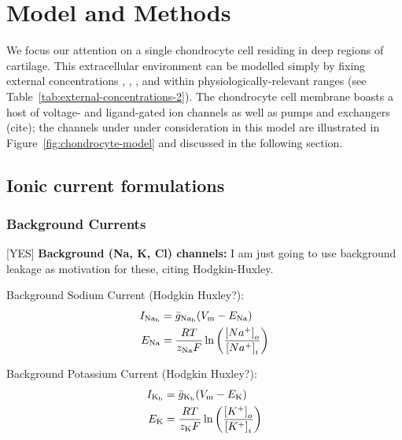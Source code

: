 \section*{Model and Methods}
\label{sec:model-and-methods}

We focus our attention on a single chondrocyte cell residing in deep
regions of cartilage. This extracellular environment can be modelled
simply by fixing external concentrations \Nao, \Ko, \Cao, \Ho and \Clo
within physiologically-relevant ranges (see
Table~\ref{tab:external-concentrations-2}). The chondrocyte cell
membrane boasts a host of voltage- and ligand-gated ion channels as
well as pumps and exchangers (cite); the channels under under
consideration in this model are illustrated in
Figure~\ref{fig:chondrocyte-model} and discussed in the following
section.

\subsection*{Ionic current formulations}
\label{sec:formulation-ionic-current}


\subsubsection*{Background Currents}
\label{sec:background-currents}

[YES] {\bf Background (Na, K, Cl) channels:} I am just going to use
background leakage as motivation for these, citing Hodgkin-Huxley.

Background Sodium Current (Hodgkin Huxley?):
\begin{equation}
  \begin{split}
    I_{\rm Na_b} & = \bar{g}_{\rm Na_b} (V_{\rm m} - E_{\rm Na})\\
    E_{\rm Na} & =  \frac{R T}{z_{\rm Na} F}
    \ln\left(\frac{\left[Na^{+}\right]_{o}}
      {\left[Na^{+}\right]_{i}}\right)
  \end{split}
\end{equation}

Background Potassium Current (Hodgkin Huxley?):
\begin{equation}
  \begin{split}
    I_{\rm K_b} & = \bar{g}_{\rm K_b} (V_{\rm m} - E_{\rm K})\\
    E_{\rm K} & =  \frac{R T}{z_{\rm K} F}
    \ln\left(\frac{\left[K^{+}\right]_{o}}
      {\left[K^{+}\right]_{i}}\right)
  \end{split}
\end{equation}

